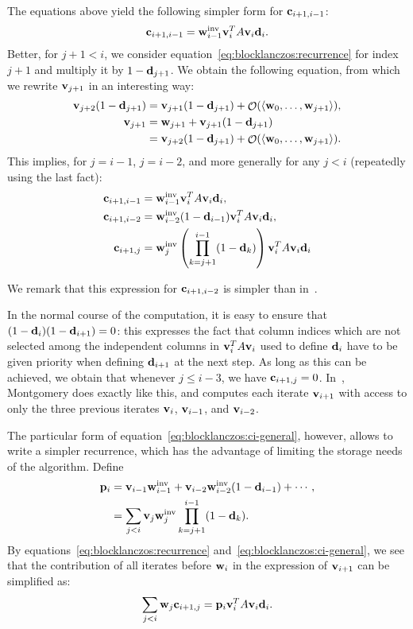 The equations above yield the following simpler form for
$\mathbf{c}_{i+1,i-1}$:
$$\mathbf{c}_{i+1,i-1} 
    =\mathbf{w}_{i-1}^{\text{inv}} \mathbf{v}_i^TA\mathbf{v}_i\mathbf{d}_i.$$
Better, for $j+1<i$, we
consider
equation~\eqref{eq:blocklanczos:recurrence} for index $j+1$ and
multiply it by $1-\mathbf{d}_{j+1}$. We obtain the following equation, from
which we rewrite $\mathbf{v}_{j+1}$ in an interesting way:
\begin{align*}
    \mathbf{v}_{j+2}(1-\mathbf{d}_{j+1})&=\mathbf{v}_{j+1}(1-\mathbf{d}_{j+1}) +
    \mathop{\mathcal{O}}(\langle\mathbf{w}_0,\ldots,\mathbf{w}_{j+1}\rangle),\\
    \mathbf{v}_{j+1} &= \mathbf{w}_{j+1} + \mathbf{v}_{j+1}(1-\mathbf{d}_{j+1})\\
&= \mathbf{v}_{j+2}(1-\mathbf{d}_{j+1})  +
    \mathop{\mathcal{O}}(\langle\mathbf{w}_0,\ldots,\mathbf{w}_{j+1}\rangle).
\end{align*}
This implies, for $j=i-1$, $j=i-2$, and more generally for any $j<i$
(repeatedly using the last fact):
\begin{align}
    \notag \mathbf{c}_{i+1,i-1} 
    &=\mathbf{w}_{i-1}^{\text{inv}} \mathbf{v}_i^TA\mathbf{v}_i\mathbf{d}_i,\\
    \notag \mathbf{c}_{i+1,i-2} &=\mathbf{w}_{i-2}^{\text{inv}}
(1-\mathbf{d}_{i-1})\mathbf{v}_{i}^TA\mathbf{v}_i\mathbf{d}_i,\\
\label{eq:blocklanczos:ci-general}
\mathbf{c}_{i+1,j} &= \mathbf{w}_j^{\text{inv}}
    \left(\prod_{k=j+1}^{i-1}(1-\mathbf{d}_{k})\right)\mathbf{v}_i^TA\mathbf{v}_i\mathbf{d}_i
\end{align}

We remark that this expression for $\mathbf{c}_{i+1,i-2}$ is simpler than 
in~\cite{EC:Montgomery95}.

In the normal course of the computation, it is easy to ensure that
$(1-\mathbf{d}_i)(1-\mathbf{d}_{i+1})=0$: this expresses the fact that column indices
which are not selected among the independent columns in $\mathbf{v}_i^TA\mathbf{v}_i$
used to define $\mathbf{d}_i$ have to be given priority when defining
$\mathbf{d}_{i+1}$ at the next step. As long as this can be achieved, we obtain
that whenever $j\leq i-3$, we have $\mathbf{c}_{i+1,j}=0$.
In~\cite{EC:Montgomery95}, Montgomery does exactly like this, and computes
each iterate $\mathbf{v}_{i+1}$ with access to only the
three previous iterates $\mathbf{v}_i$, $\mathbf{v}_{i-1}$, and $\mathbf{v}_{i-2}$.

The particular form of equation~\eqref{eq:blocklanczos:ci-general},
however, allows to write a simpler recurrence, which has the advantage of
limiting the storage needs of the algorithm. Define
\begin{align*}
    \mathbf{p}_i&=\mathbf{v}_{i-1}\mathbf{w}_{i-1}^{\text{inv}}
    +\mathbf{v}_{i-2}\mathbf{w}_{i-2}^{\text{inv}}(1-\mathbf{d}_{i-1})
+\cdots,\\
    &=\sum_{j<i}\mathbf{v}_{j}\mathbf{w}_{j}^{\text{inv}}\prod_{k=j+1}^{i-1}(1-\mathbf{d}_k).
\end{align*}
By equations~\eqref{eq:blocklanczos:recurrence}
and~\eqref{eq:blocklanczos:ci-general}, we see that the contribution of
all iterates before $\mathbf{w}_i$ in the expression of $\mathbf{v}_{i+1}$ can be
simplified as:
\begin{equation*}
\sum_{j<i}\mathbf{w}_j\mathbf{c}_{i+1,j} = \mathbf{p}_i\mathbf{v}_i^TA\mathbf{v}_i\mathbf{d}_i.
\end{equation*}




